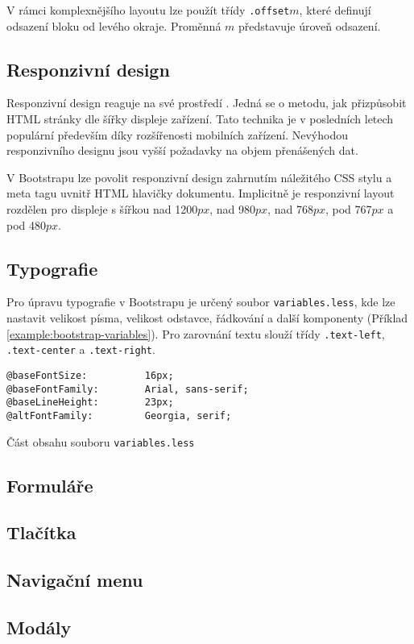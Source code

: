 V rámci komplexnějšího layoutu lze použít třídy \texttt{.offset}$m$, které definují odsazení bloku od levého okraje. Proměnná $m$ představuje úroveň odsazení.

\subsection{Responzivní design}

Responzivní design reaguje na své prostředí \cite{responsive-design}. Jedná se o metodu, jak přizpůsobit HTML stránky dle šířky displeje zařízení. Tato technika je v posledních letech populární především díky rozšířenosti mobilních zařízení. Nevýhodou responzivního designu jsou vyšší požadavky na objem přenášených dat.

V Bootstrapu lze povolit responzivní design zahrnutím náležitého CSS stylu a meta tagu uvnitř HTML hlavičky dokumentu. Implicitně je responzivní layout rozdělen pro displeje s šířkou nad 1200$px$, nad 980$px$, nad 768$px$, pod 767$px$ a pod 480$px$.

\subsection{Typografie}

Pro úpravu typografie v Bootstrapu je určený soubor \texttt{variables.less}, kde lze nastavit velikost písma, velikost odstavce, řádkování a další komponenty (Příklad \ref{example:bootstrap-variables}). Pro zarovnání textu slouží třídy \texttt{.text-left}, \texttt{.text-center} a \texttt{.text-right}.

\begin{example}
    \centering
    \begin{lstlisting}
@baseFontSize:          16px;
@baseFontFamily:        Arial, sans-serif;
@baseLineHeight:        23px;
@altFontFamily:         Georgia, serif;
    \end{lstlisting}
    \caption{Část obsahu souboru \texttt{variables.less}}
    \label{example:bootstrap-variables}
\end{example}

\subsection{Formuláře}
\subsection{Tlačítka}
\subsection{Navigační menu}
\subsection{Modály}
